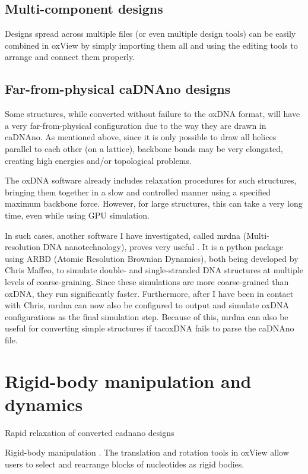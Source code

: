 \subsection{Multi-component designs}
Designs spread across multiple files (or even multiple design tools) can be easily combined in oxView by simply importing them all and using the editing tools to arrange and connect them properly.

\subsection{Far-from-physical caDNAno designs}
Some structures, while converted without failure to the oxDNA format, will have a very far-from-physical configuration due to the way they are drawn in caDNAno. As mentioned above, since it is only possible to draw all helices parallel to each other (on a lattice), backbone bonds may be very elongated, creating high energies and/or topological problems.

The oxDNA software already includes relaxation procedures for such structures, bringing them together in a slow and controlled manner using a specified maximum backbone force. However, for large structures, this can take a very long time, even while using GPU simulation.

In such cases, another software I have investigated, called mrdna (Multi-resolution DNA nanotechnology), proves very useful \cite{maffeo2018}. It is a python package using ARBD (Atomic Resolution Brownian Dynamics), both being developed by Chris Maffeo, to simulate double- and single-stranded DNA structures at multiple levels of coarse-graining. Since these simulations are more coarse-grained than oxDNA, they run significantly faster. Furthermore, after I have been in contact with Chris, mrdna can now also be configured to output and simulate oxDNA configurations as the final simulation step. Because of this, mrdna can also be useful for converting simple structures if tacoxDNA fails to parse the caDNAno file.

\section{Rigid-body manipulation and dynamics}
\label{sec:rigid-body_dynamics}
Rapid relaxation of converted cadnano designs

Rigid-body manipulation \cite{huang2019uncertainty}. The translation and rotation tools in oxView allow users to select and rearrange blocks of nucleotides as rigid bodies. 

